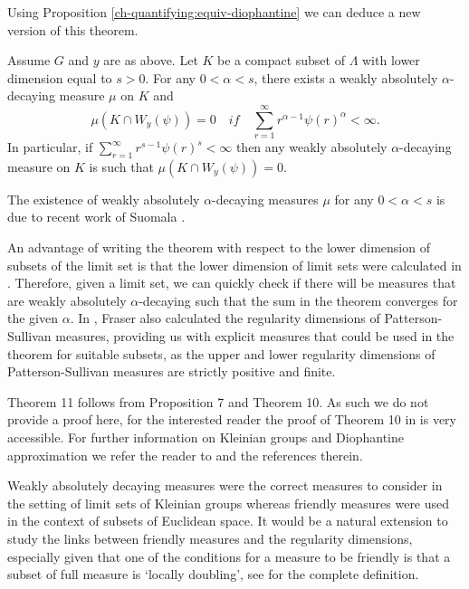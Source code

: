 Using Proposition \ref{ch-quantifying:equiv-diophantine} we can deduce a new version of this theorem.

\begin{theorem}
	Assume $G$ and $y$ are as above. Let $K$ be a compact subset of $\Lambda$ with lower dimension equal to $s > 0$. For any $0 < \alpha < s$, there exists a weakly absolutely $\alpha$-decaying measure $\mu$ on $K$ and 
	\[
	\mu(K\cap W_y(\psi)) = 0 \quad if \quad \sum_{r=1}^\infty r^{\alpha-1} \psi(r)^{\alpha} < \infty.
	\]
	In particular, if  $\sum_{r=1}^\infty r^{s-1} \psi(r)^{s} < \infty$ then any weakly absolutely $\alpha$-decaying measure on $K$ is such that $\mu(K\cap W_y(\psi)) = 0$.
\end{theorem}

The existence of weakly absolutely $\alpha$-decaying measures $\mu$ for any $0< \alpha < s$ is due to recent work of Suomala \cite[Theorem 4.1]{suomala}.

An advantage of writing the theorem with respect to the lower dimension of subsets of the limit set is that the lower dimension of limit sets were calculated in \cite{fraser2}. Therefore, given a limit set, we can quickly check if there will be measures that are weakly absolutely $\alpha$-decaying such that the sum in the theorem converges for the given $\alpha$. In \cite{fraser2}, Fraser also calculated the regularity dimensions of Patterson-Sullivan measures, providing us with explicit measures that could be used in the theorem for suitable subsets, as the upper and lower regularity dimensions of Patterson-Sullivan measures are strictly positive and finite. 

Theorem 11 follows from Proposition 7 and Theorem 10. As such we do not provide a proof here, for the interested reader the proof of Theorem 10 in \cite{beres-sanju-al} is very accessible. For further information on Kleinian groups and Diophantine approximation we refer the reader to \cite{beres-sanju-al, fraser2} and the references therein.

Weakly absolutely decaying measures were the correct measures to consider in the setting of limit sets of Kleinian groups whereas friendly measures were used in the context of subsets of Euclidean space. It would be a natural extension to study the links between friendly measures and the regularity dimensions, especially given that one of the conditions for a measure to be friendly is that a subset of full measure is `locally doubling', see \cite{friendly} for the complete definition.  

